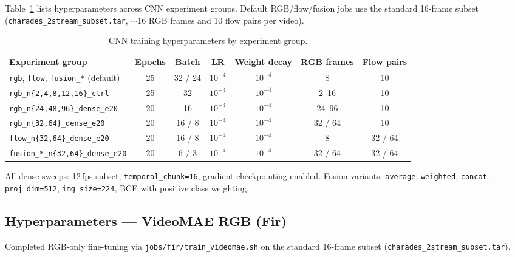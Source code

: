 \documentclass[11pt,a4paper]{article}
\begin{document}
Table~\ref{tab:cnn-hparams} lists hyperparameters across CNN experiment groups. Default
RGB/flow/fusion jobs use the standard 16-frame subset
(\texttt{charades\_2stream\_subset.tar}, $\sim$16 RGB frames and 10 flow pairs per video).

\begin{table}[h]
\centering
\caption{CNN training hyperparameters by experiment group.}
\label{tab:cnn-hparams}
\small
\begin{tabular}{@{}lcccccc@{}}
\toprule
Experiment group & Epochs & Batch & LR & Weight decay & RGB frames & Flow pairs \\
\midrule
\texttt{rgb}, \texttt{flow}, \texttt{fusion\_*} (default) & 25 & 32 / 24 & $10^{-4}$ & $10^{-4}$ & 8 & 10 \\
\texttt{rgb\_n\{2,4,8,12,16\}\_ctrl} & 25 & 32 & $10^{-4}$ & $10^{-4}$ & 2--16 & 10 \\
\texttt{rgb\_n\{24,48,96\}\_dense\_e20} & 20 & 16 & $10^{-4}$ & $10^{-4}$ & 24--96 & 10 \\
\texttt{rgb\_n\{32,64\}\_dense\_e20} & 20 & 16 / 8 & $10^{-4}$ & $10^{-4}$ & 32 / 64 & 10 \\
\texttt{flow\_n\{32,64\}\_dense\_e20} & 20 & 16 / 8 & $10^{-4}$ & $10^{-4}$ & 8 & 32 / 64 \\
\texttt{fusion\_*\_n\{32,64\}\_dense\_e20} & 20 & 6 / 3 & $10^{-4}$ & $10^{-4}$ & 32 / 64 & 32 / 64 \\
\bottomrule
\end{tabular}

\vspace{0.5em}
\footnotesize
All dense sweeps: 12\,fps subset, \texttt{temporal\_chunk=16}, gradient checkpointing enabled.
Fusion variants: \texttt{average}, \texttt{weighted}, \texttt{concat}.
\texttt{proj\_dim=512}, \texttt{img\_size=224}, BCE with positive class weighting.
\end{table}

\subsection{Hyperparameters --- VideoMAE RGB (Fir)}

Completed RGB-only fine-tuning via \texttt{jobs/fir/train\_videomae.sh} on the standard
16-frame subset (\texttt{charades\_2stream\_subset.tar}).
\end{document}
